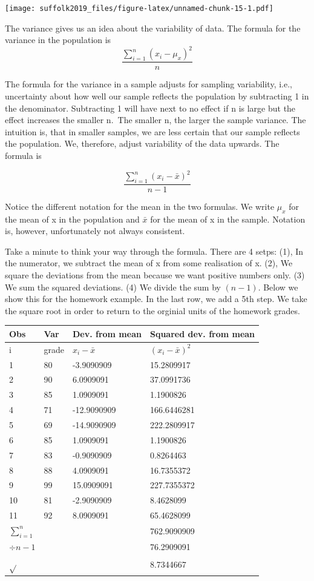 \documentclass[]{article}
\begin{document}
\texttt{[image: suffolk2019\_files/figure-latex/unnamed-chunk-15-1.pdf]}

The variance gives us an idea about the variability of data. The formula for the variance in the population is \[ \frac{\sum_{i=1}^n(x_i - \mu_x)^2}{n}\]

The formula for the variance in a sample adjusts for sampling variability, i.e., uncertainty about how well our sample reflects the population by subtracting 1 in the denominator. Subtracting 1 will have next to no effect if n is large but the effect increases the smaller n.~The smaller n, the larger the sample variance. The intuition is, that in smaller samples, we are less certain that our sample reflects the population. We, therefore, adjust variability of the data upwards. The formula is

\[ \frac{\sum_{i=1}^n(x_i - \bar{x})^2}{n-1}\]

Notice the different notation for the mean in the two formulas. We write \(\mu_x\) for the mean of x in the population and \(\bar{x}\) for the mean of x in the sample. Notation is, however, unfortunately not always consistent.

Take a minute to think your way through the formula. There are 4 setps: (1), In the numerator, we subtract the mean of x from some realisation of x. (2), We square the deviations from the mean because we want positive numbers only. (3) We sum the squared deviations. (4) We divide the sum by \((n-1)\). Below we show this for the homework example. In the last row, we add a 5th step. We take the square root in order to return to the orginial units of the homework grades.

\begin{longtable}[]{@{}llll@{}}
\toprule
Obs & Var & Dev. from mean & Squared dev. from mean\tabularnewline
\midrule
\endhead
i & grade & \(x_i-\bar{x}\) & \((x_i-\bar{x})^2\)\tabularnewline
1 & 80 & -3.9090909 & 15.2809917\tabularnewline
2 & 90 & 6.0909091 & 37.0991736\tabularnewline
3 & 85 & 1.0909091 & 1.1900826\tabularnewline
4 & 71 & -12.9090909 & 166.6446281\tabularnewline
5 & 69 & -14.9090909 & 222.2809917\tabularnewline
6 & 85 & 1.0909091 & 1.1900826\tabularnewline
7 & 83 & -0.9090909 & 0.8264463\tabularnewline
8 & 88 & 4.0909091 & 16.7355372\tabularnewline
9 & 99 & 15.0909091 & 227.7355372\tabularnewline
10 & 81 & -2.9090909 & 8.4628099\tabularnewline
11 & 92 & 8.0909091 & 65.4628099\tabularnewline
\(\sum_{i=1}^n\) & & & 762.9090909\tabularnewline
\(\div n-1\) & & & 76.2909091\tabularnewline
\(\sqrt{}\) & & & 8.7344667\tabularnewline
\bottomrule
\end{longtable}
\end{document}
